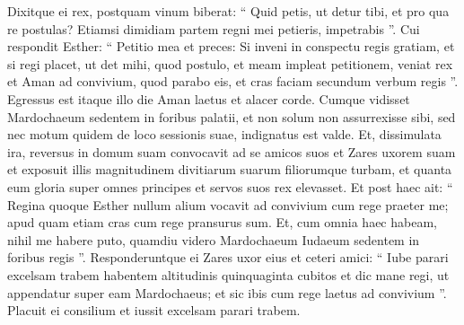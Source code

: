 \begin{biblechapter}
\begin{biblechapter}
\begin{biblechapter}
\begin{biblechapter}
\begin{biblechapter}
\verse Dixitque ei rex, postquam vinum biberat: “ Quid petis, ut detur tibi, et pro qua re postulas? Etiamsi dimidiam partem regni mei petieris, impetrabis ”. 
\verse Cui respondit Esther: “ Petitio mea et preces: 
\verse Si inveni in conspectu regis gratiam, et si regi placet, ut det mihi, quod postulo, et meam impleat petitionem, veniat rex et Aman ad convivium, quod parabo eis, et cras faciam secundum verbum regis ”.
 \verse Egressus est itaque illo die Aman laetus et alacer corde. Cumque vidisset Mardochaeum sedentem in foribus palatii, et non solum non assurrexisse sibi, sed nec motum quidem de loco sessionis suae, indignatus est valde. 
\verse Et, dissimulata ira, reversus in domum suam convocavit ad se amicos suos et Zares uxorem suam 
\verse et exposuit illis magnitudinem divitiarum suarum filiorumque turbam, et quanta eum gloria super omnes principes et servos suos rex elevasset. 
\verse Et post haec ait: “ Regina quoque Esther nullum alium vocavit ad convivium cum rege praeter me; apud quam etiam cras cum rege pransurus sum. 
 \verse Et, cum omnia haec habeam, nihil me habere puto, quamdiu videro Mardochaeum Iudaeum sedentem in foribus regis ”. 
\verse Responderuntque ei Zares uxor eius et ceteri amici: “ Iube parari excelsam trabem habentem altitudinis quinquaginta cubitos et dic mane regi, ut appendatur super eam Mardochaeus; et sic ibis cum rege laetus ad convivium ”. Placuit ei consilium et iussit excelsam parari trabem.
 

\end{biblechapter}
\end{biblechapter}
\end{biblechapter}
\end{biblechapter}
\end{biblechapter}
